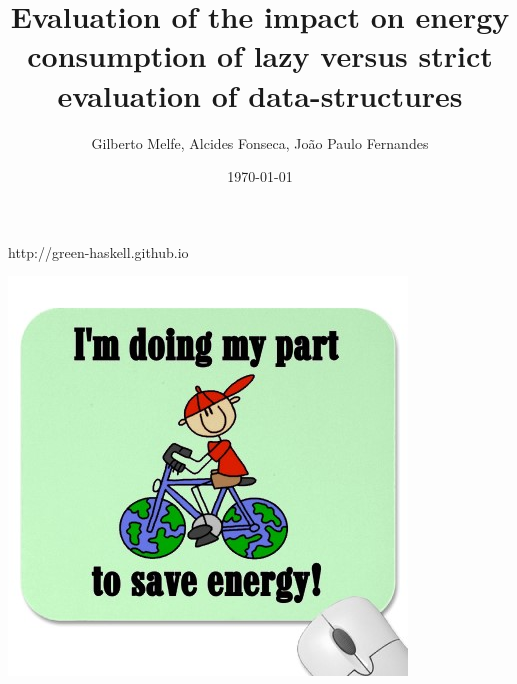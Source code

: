 \documentclass[10pt]{beamer}
\title%
{Evaluation of the impact on energy consumption of lazy versus strict evaluation of data-structures}
\date{\today}
\author[G. Melfe, A. Fonseca, J. P. Fernandes]{Gilberto Melfe, Alcides Fonseca, Jo\~{a}o Paulo Fernandes}
\begin{document}



        \begin{frame}

            \maketitle


        \end{frame}



        

        

        

        



        \begin{frame}

            \maketitle

		\begin{center}
		    http://green-haskell.github.io
		\end{center}

            \includegraphics[width=.25\textwidth]{images/i_m_saving_energy} 


        \end{frame}




    
\end{document}
